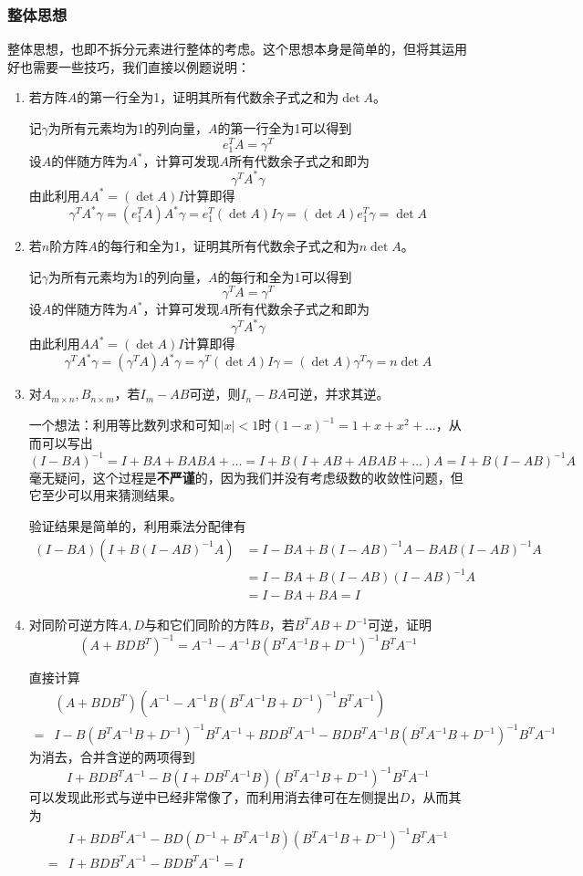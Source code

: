 \documentclass[a4paper,UTF8,fontset=windows]{ctexart}
\newcommand*{\note}{\noindent *}
\begin{document}
\subsubsection{整体思想}
整体思想，也即不拆分元素进行整体的考虑。这个思想本身是简单的，但将其运用好也需要一些技巧，我们直接以例题说明：
\begin{enumerate}
    \item 若方阵$A$的第一行全为1，证明其所有代数余子式之和为$\det A$。
    
    记$\gamma$为所有元素均为1的列向量，$A$的第一行全为1可以得到
    $$e_1^TA=\gamma^T$$
    设$A$的伴随方阵为$A^*$，计算可发现$A$所有代数余子式之和即为
    $$\gamma^TA^*\gamma$$
    由此利用$AA^*=(\det A)I$计算即得
    $$\gamma^TA^*\gamma=(e_1^TA)A^*\gamma=e_1^T(\det A)I\gamma=(\det A)e_1^T\gamma=\det A$$

    \item 若$n$阶方阵$A$的每行和全为1，证明其所有代数余子式之和为$n\det A$。
    
    记$\gamma$为所有元素均为1的列向量，$A$的每行和全为1可以得到
    $$\gamma^TA=\gamma^T$$
    设$A$的伴随方阵为$A^*$，计算可发现$A$所有代数余子式之和即为
    $$\gamma^TA^*\gamma$$
    由此利用$AA^*=(\det A)I$计算即得
    $$\gamma^TA^*\gamma=(\gamma^TA)A^*\gamma=\gamma^T(\det A)I\gamma=(\det A)\gamma^T\gamma=n\det A$$
    
    \item 对$A_{m\times n},B_{n\times m}$，若$I_m-AB$可逆，则$I_n-BA$可逆，并求其逆。
    
    \note 一个想法：利用等比数列求和可知$|x|<1$时$(1-x)^{-1}=1+x+x^2+\dots$，从而可以写出
    $$(I-BA)^{-1}=I+BA+BABA+\dots=I+B(I+AB+ABAB+\dots)A=I+B(I-AB)^{-1}A$$
    毫无疑问，这个过程是\textbf{不严谨}的，因为我们并没有考虑级数的收敛性问题，但它至少可以用来猜测结果。

    验证结果是简单的，利用乘法分配律有
    $$\begin{aligned}(I-BA)(I+B(I-AB)^{-1}A)&=I-BA+B(I-AB)^{-1}A-BAB(I-AB)^{-1}A\\ &=I-BA+B(I-AB)(I-AB)^{-1}A\\ &=I-BA+BA=I\end{aligned}$$
    
    \item 对同阶可逆方阵$A,D$与和它们同阶的方阵$B$，若$B^TAB+D^{-1}$可逆，证明
    $$(A+BDB^T)^{-1}=A^{-1}-A^{-1}B(B^TA^{-1}B+D^{-1})^{-1}B^TA^{-1}$$

    直接计算
    $$\begin{aligned}&(A+BDB^T)(A^{-1}-A^{-1}B(B^TA^{-1}B+D^{-1})^{-1}B^TA^{-1})\\ =&I-B(B^TA^{-1}B+D^{-1})^{-1}B^TA^{-1}+BDB^TA^{-1}-BDB^TA^{-1}B(B^TA^{-1}B+D^{-1})^{-1}B^TA^{-1}\end{aligned}$$
    为消去，合并含逆的两项得到
    $$I+BDB^TA^{-1}-B(I+DB^TA^{-1}B)(B^TA^{-1}B+D^{-1})^{-1}B^TA^{-1}$$
    可以发现此形式与逆中已经非常像了，而利用消去律可在左侧提出$D$，从而其为
    $$\begin{aligned}&I+BDB^TA^{-1}-BD(D^{-1}+B^TA^{-1}B)(B^TA^{-1}B+D^{-1})^{-1}B^TA^{-1}\\=&I+BDB^TA^{-1}-BDB^TA^{-1}=I\end{aligned}$$



\end{enumerate}
\end{document}
